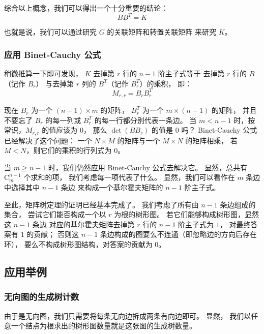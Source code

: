 \documentclass[UTF8]{article}
\begin{document}
	\bigskip

	综合以上概念，我们可以得出一个十分重要的结论：
	$$
	B B^T = K
	$$

	也就是说，我们可以通过研究 $G$ 的关联矩阵和转置关联矩阵
	来研究 $K$。

	\subsubsection{应用 Binet-Cauchy 公式}

	稍微推算一下即可发现，
	$K$ 去掉第 $r$ 行的 $n - 1$ 阶主子式等于
	去掉第 $r$ 行的 $B$（记作 $B_r$） 
	与去掉第 $r$ 列的 $B^T$（记作 $B^T_r$）的乘积，
	即：
	$$
	M_{r, r} = B_r B^T_r
	$$

	现在 $B_r$ 为一个 $(n - 1) \times m$ 的矩阵，
	$B^T_r$ 为一个 $m \times (n - 1)$ 的矩阵，
	并且不要忘了 $B_r$ 的每一列或 $B^T_r$ 的每一行都分别代表一条边。
	当 $m < n - 1$ 时，按常识，$M_{r, r}$ 的值应该为 $0$，
	那么 $\det(B B_r)$ 的值是 $0$ 吗？
	Binet-Cauchy 公式已经解决了这个问题：
	一个 $N \times M$ 的矩阵与一个 $M \times N$ 的矩阵相乘，
	若 $M < N$，则它们的乘积的行列式为 $0$。 

	当 $m \ge n - 1$ 时，我们仍然应用 Binet-Cauchy 公式去解决它。
	显然，总共有 $\mathrm{C}_{m}^{n - 1}$ 个求和的项，
	我们考虑每一项代表了什么。
	显然，我们可以看作在 $m$ 条边中选择其中 $n - 1$ 条边
	来构成一个基尔霍夫矩阵的 $n - 1$ 阶主子式。
	
	\bigskip

	至此，矩阵树定理的证明已经基本完成了。
	我们考虑了所有由 $n - 1$ 条边组成的集合，
	尝试它们能否构成一个以 $r$ 为根的树形图。
	若它们能够构成树形图，显然这 $n - 1$ 条边
	对应的基尔霍夫矩阵去掉第 $r$ 行的 $n - 1$ 阶主子式为 $1$，
	对最终答案有 $1$ 的贡献；
	否则这 $n - 1$ 条边构成的图要么不连通（即忽略边的方向后存在环），
	要么不构成树形图结构，对答案的贡献为 $0$。
	
	\bigskip

	{}

	\subsection{应用举例}

	\subsubsection{无向图的生成树计数}
	
	由于是无向图，我们只需要将每条无向边拆成两条有向边即可。
	显然，
	我们以任意一个结点为根求出的树形图数量就是这张图的生成树数量。
\end{document}
